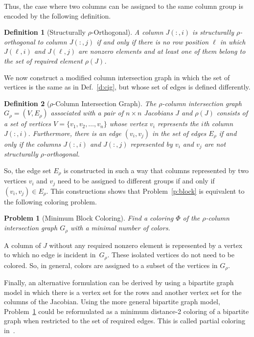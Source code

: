 \documentclass[12pt, twoside,a4paper,toc=bibliography]{scrbook}
\newtheorem{problem}{Problem}
\newtheorem{definition}{Definition}
\newcommand{\sparsifysymbol}{\ensuremath{\rho}}
\newcommand{\sparsify}[1]{\ensuremath{\sparsifysymbol(#1)}}
\begin{document}
Thus, the case where two columns can be assigned to the same column group is encoded by
the following definition.

\begin{definition}[Structurally $\sparsifysymbol$-Orthogonal]
A column $J(:,i)$ is structurally $\sparsifysymbol$-orthogonal to column $J(:,j)$ if and
only if there is no row position $\ell$ in which $J(\ell,i)$ and $J(\ell,j)$ are nonzero
elements and at least one of them belong to the set of required element \sparsify{J}.
\end{definition}

We now construct a modified column intersection graph in which the set of vertices is the
same as in Def.~\ref{d:cig}, but whose set of edges is defined differently.
%
\begin{definition}[$\sparsifysymbol$-Column Intersection Graph]
\label{d.part.cig}
The $\sparsifysymbol$-column intersection graph $G_\sparsifysymbol =
(V,E_\sparsifysymbol)$ associated with a pair of $n \times n$ Jacobians $J$ and
\sparsify{J} consists of a set of vertices $V=\{v_1, v_2, \dots, v_n\}$ whose vertex
$v_i$ represents the $i$th column $J(:,i)$. Furthermore, there is an edge $(v_i,v_j)$ in
the set of edges $E_\sparsifysymbol$ if and only if the columns $J(:,i)$ and $J(:,j)$
represented by $v_i$ and $v_j$ are not structurally $\sparsifysymbol$-orthogonal.
\end{definition}

So, the edge set $E_\sparsifysymbol$ is constructed in such a way that columns
represented by two vertices $v_i$ and $v_j$ need to be assigned to different groups if
and only if $(v_i, v_j) \in E_\sparsifysymbol$. This constructions shows that
Problem~\ref{p:block} is equivalent to the following coloring problem.
%
\begin{problem}[Minimum Block Coloring]
\label{p:minblockcol}
%
Find a coloring $\Phi$ of the $\sparsifysymbol$-column intersection graph
$G_\sparsifysymbol$ with a minimal number of colors.
\end{problem}

A column of $J$ without any required nonzero element is represented by a vertex to which
no edge is incident in~$G_\sparsifysymbol$. These isolated vertices do not need to be
colored. So, in general, colors are assigned to a subset of the vertices in
$G_\sparsifysymbol$.

Finally, an alternative formulation can be derived by using a bipartite graph model in
which there is a vertex set for the rows and another vertex set for the columns of the
Jacobian. Using the more general bipartite graph model, Problem~\ref{p:minblockcol} could
be reformulated as a minimum distance-2 coloring of a bipartite graph when restricted to
the set of required edges. This is called partial coloring in~\cite{Gebremedhin05whatcolor}.
\end{document}
